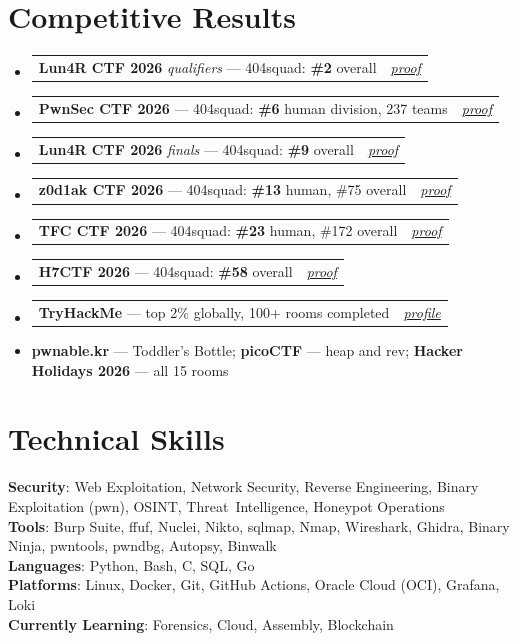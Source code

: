 \documentclass[letterpaper,11pt]{article}
\makeatletter
\newcommand{\resumeItem}[1]{
  \item\small{
    {#1\vspace{-2pt}}
  }
}
\newcommand{\resumeEntry}[2]{%
  \item
  \begin{tabular*}{\linewidth}{@{}l@{\extracolsep{\fill}}r@{}}
    #1 & \textit{\small #2} \\
  \end{tabular*}\vspace{-6pt}%
}
\newcommand{\resumeSubHeadingListStart}{\begin{itemize}[leftmargin=0.15in, label={}]}
\newcommand{\resumeSubHeadingListEnd}{\end{itemize}}
\makeatother
\begin{document}
\section{Competitive Results}
  \resumeSubHeadingListStart
    \resumeEntry{\textbf{Lun4R CTF 2026} \emph{qualifiers} --- 404squad: \textbf{\#2} overall}{\href{https://github.com/aaadarsh1337/cybersecurity-achievements/tree/main/Lun4R-quals}{proof}}
    \resumeEntry{\textbf{PwnSec CTF 2026} --- 404squad: \textbf{\#6} human division, 237 teams}{\href{https://github.com/aaadarsh1337/cybersecurity-achievements/tree/main/PwnSec}{proof}}
    \resumeEntry{\textbf{Lun4R CTF 2026} \emph{finals} --- 404squad: \textbf{\#9} overall}{\href{https://github.com/aaadarsh1337/cybersecurity-achievements/tree/main/Lun4R-finals}{proof}}
    \resumeEntry{\textbf{z0d1ak CTF 2026} --- 404squad: \textbf{\#13} human, \#75 overall}{\href{https://github.com/aaadarsh1337/cybersecurity-achievements/tree/main/z0d1ak-ctf}{proof}}
    \resumeEntry{\textbf{TFC CTF 2026} --- 404squad: \textbf{\#23} human, \#172 overall}{\href{https://github.com/aaadarsh1337/cybersecurity-achievements/tree/main/TFCCTF}{proof}}
    \resumeEntry{\textbf{H7CTF 2026} --- 404squad: \textbf{\#58} overall}{\href{https://github.com/aaadarsh1337/cybersecurity-achievements/tree/main/H7CTF}{proof}}
    \resumeEntry{\textbf{TryHackMe} --- top 2\% globally, 100+ rooms completed}{\href{https://tryhackme.com/p/aaadarsh1337}{profile}}
    \resumeItem{\textbf{pwnable.kr} --- Toddler's Bottle; \textbf{picoCTF} --- heap and rev; \textbf{Hacker Holidays 2026} --- all 15 rooms}
  \resumeSubHeadingListEnd


\section{Technical Skills}
 \begin{itemize}[leftmargin=0.15in, label={}]
    \small{\item{
     \textbf{Security}{: Web Exploitation, Network Security, Reverse Engineering, Binary Exploitation (pwn), OSINT, Threat~Intelligence, Honeypot Operations} \\
     \textbf{Tools}{: Burp Suite, ffuf, Nuclei, Nikto, sqlmap, Nmap, Wireshark, Ghidra, Binary Ninja, pwntools, pwndbg, Autopsy, Binwalk} \\
     \textbf{Languages}{: Python, Bash, C, SQL, Go} \\
     \textbf{Platforms}{: Linux, Docker, Git, GitHub Actions, Oracle Cloud (OCI), Grafana, Loki} \\
     \textbf{Currently Learning}{: Forensics, Cloud, Assembly, Blockchain}
    }}
 \end{itemize}
\end{document}
